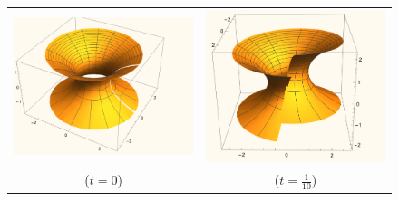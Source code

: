 \begin{figure}[ht]
        \center
        \scriptsize
        \begin{tabular}{cc}
                \includegraphics[scale=0.2]{images/catenoid2helicold0.png} &\includegraphics[scale=0.2]{images/catenoid2helicold1_10.png}\\
                ($t=0$) & ($t=\frac{1}{10}$) \\

\end{tabular}
\end{figure}
